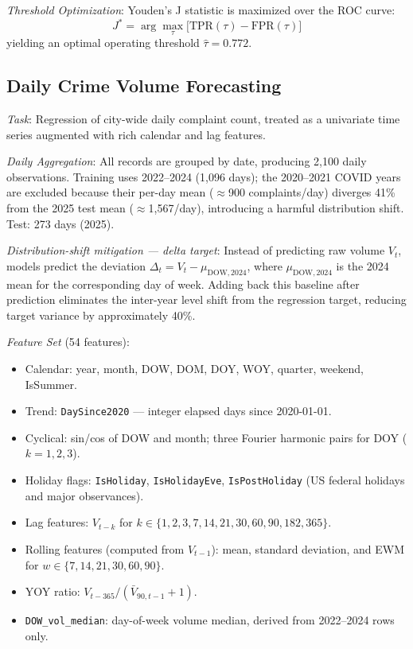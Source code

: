\documentclass[conference]{IEEEtran}
\begin{document}
\textit{Threshold Optimization}: Youden's J statistic \cite{fluss2005} is maximized over the ROC curve:
\begin{equation}
  J^* = \arg\max_\tau \bigl[\text{TPR}(\tau) - \text{FPR}(\tau)\bigr]
\end{equation}
yielding an optimal operating threshold $\hat{\tau} = 0.772$.

\subsection{Daily Crime Volume Forecasting}

\textit{Task}: Regression of city-wide daily complaint count, treated as a univariate time series augmented with rich calendar and lag features.

\textit{Daily Aggregation}: All records are grouped by date, producing 2,100 daily observations. Training uses 2022--2024 (1,096 days); the 2020--2021 COVID years are excluded because their per-day mean ($\approx$900 complaints/day) diverges 41\% from the 2025 test mean ($\approx$1,567/day), introducing a harmful distribution shift. Test: 273 days (2025).

\textit{Distribution-shift mitigation — delta target}: Instead of predicting raw volume $V_t$, models predict the deviation $\Delta_t = V_t - \mu_{\text{DOW},2024}$, where $\mu_{\text{DOW},2024}$ is the 2024 mean for the corresponding day of week. Adding back this baseline after prediction eliminates the inter-year level shift from the regression target, reducing target variance by approximately 40\%.

\textit{Feature Set} (54 features):
\begin{itemize}
  \item Calendar: year, month, DOW, DOM, DOY, WOY, quarter, weekend, IsSummer.
  \item Trend: \texttt{DaySince2020} — integer elapsed days since 2020-01-01.
  \item Cyclical: sin/cos of DOW and month; three Fourier harmonic pairs for DOY ($k = 1, 2, 3$).
  \item Holiday flags: \texttt{IsHoliday}, \texttt{IsHolidayEve}, \texttt{IsPostHoliday} (US federal holidays and major observances).
  \item Lag features: $V_{t-k}$ for $k \in \{1, 2, 3, 7, 14, 21, 30, 60, 90, 182, 365\}$.
  \item Rolling features (computed from $V_{t-1}$): mean, standard deviation, and EWM for $w \in \{7, 14, 21, 30, 60, 90\}$.
  \item YOY ratio: $V_{t-365} / (\bar{V}_{90,t-1} + 1)$.
  \item \texttt{DOW\_vol\_median}: day-of-week volume median, derived from 2022--2024 rows only.
\end{itemize}
\end{document}
